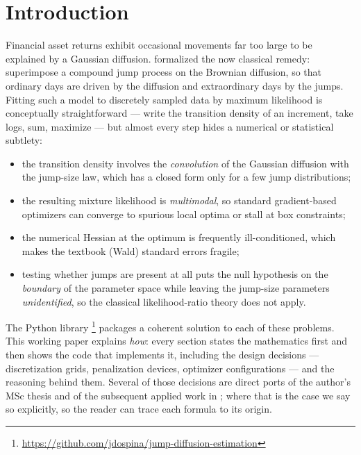 \section{Introduction}
\label{sec:introduction}

Financial asset returns exhibit occasional movements far too large to be
explained by a Gaussian diffusion. \citet{Merton1976} formalized the now
classical remedy: superimpose a compound jump process on the Brownian
diffusion, so that ordinary days are driven by the diffusion and
extraordinary days by the jumps. Fitting such a model to discretely
sampled data by maximum likelihood is conceptually straightforward ---
write the transition density of an increment, take logs, sum, maximize ---
but almost every step hides a numerical or statistical subtlety:

\begin{itemize}
  \item the transition density involves the \emph{convolution} of the
        Gaussian diffusion with the jump-size law, which has a closed form
        only for a few jump distributions;
  \item the resulting mixture likelihood is \emph{multimodal}, so standard
        gradient-based optimizers can converge to spurious local optima or
        stall at box constraints;
  \item the numerical Hessian at the optimum is frequently ill-conditioned,
        which makes the textbook (Wald) standard errors fragile;
  \item testing whether jumps are present at all puts the null hypothesis
        on the \emph{boundary} of the parameter space while leaving the
        jump-size parameters \emph{unidentified}, so the classical
        likelihood-ratio theory does not apply.
\end{itemize}

The Python library
\footnote{\url{https://github.com/jdospina/jump-diffusion-estimation}}
packages a coherent solution to each of these problems. This working paper
explains \emph{how}: every section states the mathematics first and then
shows the code that implements it, including the design decisions ---
discretization grids, penalization devices, optimizer configurations ---
and the reasoning behind them. Several of those decisions are direct ports
of the author's MSc thesis \citep{Ospina2009} and of the subsequent applied
work in \citet{Ardia2011}; where that is the case we say so explicitly, so
the reader can trace each formula to its origin.

